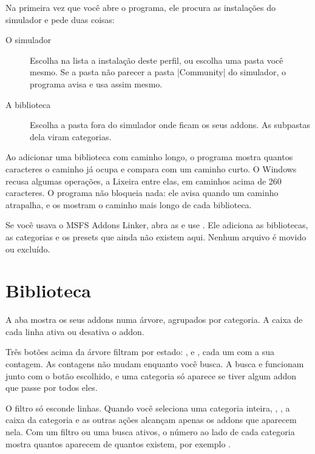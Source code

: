 \documentclass[11pt,a4paper]{article}
\begin{document}
Na primeira vez que você abre o programa, ele procura as instalações do
simulador e pede duas coisas:

\begin{description}
  \item[O simulador] Escolha na lista a instalação deste perfil, ou escolha uma
    pasta você mesmo. Se a pasta não parecer a pasta \where|Community| do
    simulador, o programa avisa e usa assim mesmo.
  \item[A biblioteca] Escolha a pasta fora do simulador onde ficam os seus
    addons. As subpastas dela viram categorias.
\end{description}

Ao adicionar uma biblioteca com caminho longo, o programa mostra quantos
caracteres o caminho já ocupa e compara com um caminho curto. O Windows recusa
algumas operações, a Lixeira entre elas, em caminhos acima de 260 caracteres. O
programa não bloqueia nada: ele avisa quando um caminho atrapalha, e os
 mostram o caminho mais longo de cada biblioteca.

Se você usava o MSFS Addons Linker, abra as  e use . Ele adiciona as bibliotecas, as categorias e os presets que
ainda não existem aqui. Nenhum arquivo é movido ou excluído.

\section{Biblioteca}

A aba  mostra os seus addons numa árvore, agrupados por
categoria. A caixa de cada linha ativa ou desativa o addon.


Três botões acima da árvore filtram por estado: ,  e
, cada um com a sua contagem. As contagens não mudam enquanto
você busca. A busca e  funcionam junto com o
botão escolhido, e uma categoria só aparece se tiver algum addon que passe por
todos eles.

O filtro só esconde linhas. Quando você seleciona uma categoria inteira,
, , a caixa da categoria e
as outras ações alcançam apenas os addons que aparecem nela. Com um filtro ou
uma busca ativos, o número ao lado de cada categoria mostra quantos aparecem de
quantos existem, por exemplo .
\end{document}
